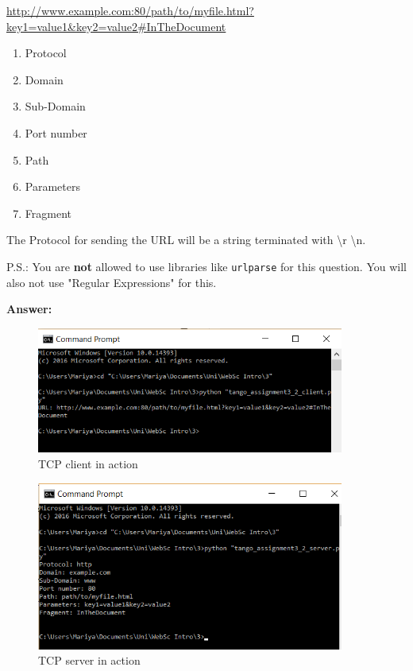 \documentclass{WeSTassignment}
\begin{document}
\url{http://www.example.com:80/path/to/myfile.html?key1=value1&key2=value2#InTheDocument}

\begin{enumerate}
\item Protocol
\item Domain
\item Sub-Domain
\item Port number
\item Path
\item Parameters
\item Fragment
\end{enumerate}

The Protocol for sending the URL will be a string terminated with \backslash r \backslash n.

P.S.: You are \textbf{not} allowed to use libraries like \texttt{urlparse} for this question. You will also not use "Regular Expressions" for this. 

\textbf{Answer:} 
\lstset{breaklines=true}


\begin{figure}[H]
	\centering
	\includegraphics[width=0.9\textwidth]{3_client.png}
	\caption{TCP client in action}
	\label{fig:tcp_server}
\end{figure}








\begin{figure}[H]
	\centering
	\includegraphics[width=0.9\textwidth]{3_server.png}
	\caption{TCP server in action}
	\label{fig:tcp_server}
\end{figure}
\end{document}

